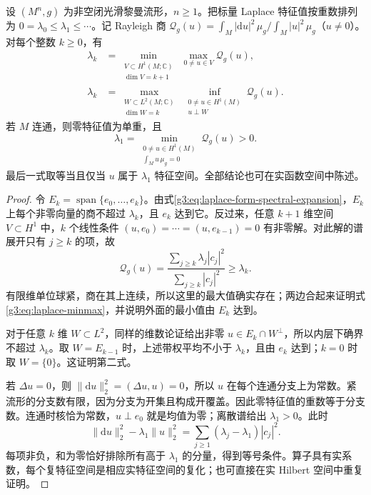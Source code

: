 \begin{theorem}[极小极大原则]\label{g3:thm:laplace-minmax}
	设 \((M^n,g)\) 为非空闭光滑黎曼流形，\(n\ge1\)。把标量 Laplace 特征值按重数排列为
	\(0=\lambda_0\le\lambda_1\le\cdots\)。记 Rayleigh 商 \(\mathscr Q_g(u)=\int_M|\mathrm du|^2\,\mu_g/\int_M|u|^2\,\mu_g\)（\(u\ne0\)）。对每个整数 \(k\ge0\)，有
	\begin{align}
		\lambda_k
		&=\min_{\substack{V\subset H^1(M;\mathbb C)\\\dim V=k+1}}
		  \ \max_{0\ne u\in V}\mathscr Q_g(u),
		\label{g3:eq:laplace-minmax}\\
		\lambda_k
		&=\max_{\substack{W\subset L^2(M;\mathbb C)\\\dim W=k}}
		  \ \inf_{\substack{0\ne u\in H^1(M)\\u\perp W}}
		  \mathscr Q_g(u).
		\label{g3:eq:laplace-maxmin}
	\end{align}
	若 \(M\) 连通，则零特征值为单重，且
	\begin{equation}\label{g3:eq:first-eigenvalue-mean-zero}
		\lambda_1=\min_{\substack{0\ne u\in H^1(M)\\\int_Mu\,\mu_g=0}}
		\mathscr Q_g(u)>0.
	\end{equation}
	最后一式取等当且仅当 \(u\) 属于 \(\lambda_1\) 特征空间。全部结论也可在实函数空间中陈述。
\end{theorem}
\begin{proof}
	令 \(E_k=\operatorname{span}\{e_0,\ldots,e_k\}\)。由式\eqref{g3:eq:laplace-form-spectral-expansion}，\(E_k\) 上每个非零向量的商不超过 \(\lambda_k\)，且 \(e_k\) 达到它。反过来，任意 \(k+1\) 维空间 \(V\subset H^1\) 中，\(k\) 个线性条件
	\((u,e_0)=\cdots=(u,e_{k-1})=0\)
	有非零解。对此解的谱展开只有 \(j\ge k\) 的项，故
	\[
		\mathscr Q_g(u)=\frac{\sum_{j\ge k}\lambda_j|c_j|^2}{\sum_{j\ge k}|c_j|^2}\ge\lambda_k.
	\]
	有限维单位球紧，商在其上连续，所以这里的最大值确实存在；两边合起来证明式\eqref{g3:eq:laplace-minmax}，并说明外面的最小值由 \(E_k\) 达到。

	对于任意 \(k\) 维 \(W\subset L^2\)，同样的维数论证给出非零 \(u\in E_k\cap W^\perp\)，所以内层下确界不超过 \(\lambda_k\)。取 \(W=E_{k-1}\) 时，上述带权平均不小于 \(\lambda_k\)，且由 \(e_k\) 达到；\(k=0\) 时取 \(W=\{0\}\)。这证明第二式。

	若 \(\Delta u=0\)，则 \(\|\mathrm du\|_2^2=(\Delta u,u)=0\)，所以 \(u\) 在每个连通分支上为常数。紧流形的分支数有限，因为分支为开集且构成开覆盖。因此零特征值的重数等于分支数。连通时核恰为常数，\(u\perp e_0\) 就是均值为零；离散谱给出 \(\lambda_1>0\)。此时
	\[
		\|\mathrm du\|_2^2-\lambda_1\|u\|_2^2
		=\sum_{j\ge1}(\lambda_j-\lambda_1)|c_j|^2.
	\]
	每项非负，和为零恰好排除所有高于 \(\lambda_1\) 的分量，得到等号条件。算子具有实系数，每个复特征空间是相应实特征空间的复化；也可直接在实 Hilbert 空间中重复证明。
\end{proof}

